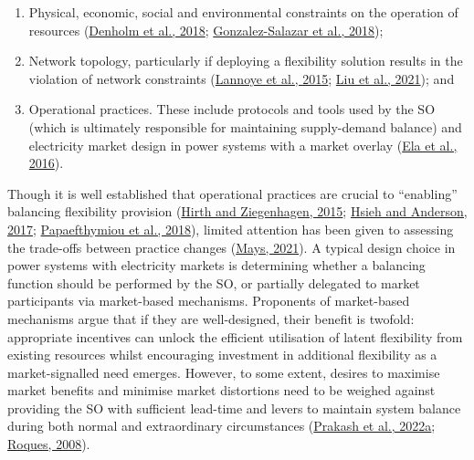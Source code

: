 \documentclass[12pt,a4paper,]{report}
\providecommand{\tightlist}{%
  \setlength{\itemsep}{0pt}\setlength{\parskip}{0pt}}
\begin{document}
\begin{enumerate}
\def\labelenumi{\arabic{enumi}.}
\tightlist
\item
  Physical, economic, social and environmental constraints on the
  operation of resources
  (\protect\hyperlink{ref-denholmHowLowCan2018}{Denholm et al., 2018};
  \protect\hyperlink{ref-gonzalez-salazarReviewOperationalFlexibility2018}{Gonzalez-Salazar
  et al., 2018});
\item
  Network topology, particularly if deploying a flexibility solution
  results in the violation of network constraints
  (\protect\hyperlink{ref-lannoyeTransmissionVariableGeneration2015}{Lannoye
  et al., 2015}; \protect\hyperlink{ref-liuGridMarketServices2021}{Liu
  et al., 2021}); and
\item
  Operational practices. These include protocols and tools used by the
  SO (which is ultimately responsible for maintaining supply-demand
  balance) and electricity market design in power systems with a market
  overlay (\protect\hyperlink{ref-elaWholesaleElectricityMarket2016}{Ela
  et al., 2016}).
\end{enumerate}

Though it is well established that operational practices are crucial to
``enabling'' balancing flexibility provision
(\protect\hyperlink{ref-hirthBalancingPowerVariable2015}{Hirth and
Ziegenhagen, 2015};
\protect\hyperlink{ref-hsiehGridFlexibilityQuiet2017}{Hsieh and
Anderson, 2017};
\protect\hyperlink{ref-papaefthymiouPowerSystemFlexibility2018}{Papaefthymiou
et al., 2018}), limited attention has been given to assessing the
trade-offs between practice changes
(\protect\hyperlink{ref-maysMissingIncentivesFlexibility2021}{Mays,
2021}). A typical design choice in power systems with electricity
markets is determining whether a balancing function should be performed
by the SO, or partially delegated to market participants via
market-based mechanisms. Proponents of market-based mechanisms argue
that if they are well-designed, their benefit is twofold: appropriate
incentives can unlock the efficient utilisation of latent flexibility
from existing resources whilst encouraging investment in additional
flexibility as a market-signalled need emerges. However, to some extent,
desires to maximise market benefits and minimise market distortions need
to be weighed against providing the SO with sufficient lead-time and
levers to maintain system balance during both normal and extraordinary
circumstances
(\protect\hyperlink{ref-prakashInsightsDesigningEffective2022}{Prakash
et al., 2022a};
\protect\hyperlink{ref-roquesMarketDesignGeneration2008}{Roques, 2008}).
\end{document}
